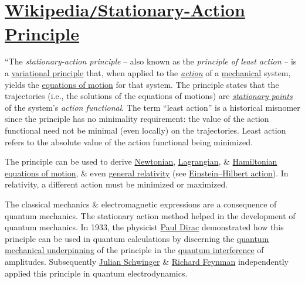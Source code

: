 \documentclass[oneside]{book}
\numberwithin{equation}{section}
\begin{document}
\section{\href{https://en.wikipedia.org/wiki/Stationary-action_principle}{Wikipedia\texttt{/}Stationary-Action Principle}}
``The \textit{stationary-action principle} -- also known as the \textit{principle of least action} -- is a \href{https://en.wikipedia.org/wiki/Variational_principle}{variational principle} that, when applied to the \href{https://en.wikipedia.org/wiki/Action_(physics)}{\textit{action}} of a \href{https://en.wikipedia.org/wiki/Mechanics}{mechanical} system, yields the \href{https://en.wikipedia.org/wiki/Equations_of_motion}{equations of motion} for that system. The principle states that the trajectories (i.e., the solutions of the equations of motions) are \href{https://en.wikipedia.org/wiki/Stationary_point}{\textit{stationary points}} of the system's \textit{action functional}. The term ``least action'' is a historical misnomer since the principle has no minimality requirement: the value of the action functional need not be minimal (even locally) on the trajectories. Least action refers to the absolute value of the action functional being minimized.

The principle can be used to derive \href{https://en.wikipedia.org/wiki/Newtonian_mechanics}{Newtonian}, \href{https://en.wikipedia.org/wiki/Lagrangian_mechanics}{Lagrangian}, \& \href{https://en.wikipedia.org/wiki/Hamiltonian_mechanics}{Hamiltonian} \href{https://en.wikipedia.org/wiki/Equations_of_motion}{equations of motion}, \& even \href{https://en.wikipedia.org/wiki/General_relativity}{general relativity} (see \href{https://en.wikipedia.org/wiki/Einstein%E2%80%93Hilbert_action}{Einstein--Hilbert action}). In relativity, a different action must be minimized or maximized.

The classical mechanics \& electromagnetic expressions are a consequence of quantum mechanics. The stationary action method helped in the development of quantum mechanics. In 1933, the physicist \href{https://en.wikipedia.org/wiki/Paul_Dirac}{Paul Dirac} demonstrated how this principle can be used in quantum calculations by discerning the \href{https://en.wikipedia.org/wiki/Path_integral_formulation#Quantum_action_principle}{quantum mechanical underpinning} of the principle in the \href{https://en.wikipedia.org/wiki/Interference_(wave_propagation)#Quantum_interference}{quantum interference} of amplitudes. Subsequently \href{https://en.wikipedia.org/wiki/Julian_Schwinger}{Julian Schwinger} \& \href{https://en.wikipedia.org/wiki/Richard_Feynman}{Richard Feynman} independently applied this principle in quantum electrodynamics.
\end{document}
